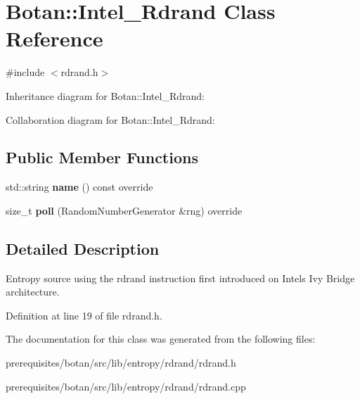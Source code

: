 \hypertarget{class_botan_1_1_intel___rdrand}{}\section{Botan\+:\+:Intel\+\_\+\+Rdrand Class Reference}
\label{class_botan_1_1_intel___rdrand}


{\ttfamily \#include $<$rdrand.\+h$>$}



Inheritance diagram for Botan\+:\+:Intel\+\_\+\+Rdrand\+:


Collaboration diagram for Botan\+:\+:Intel\+\_\+\+Rdrand\+:
\subsection*{Public Member Functions}
\begin{DoxyCompactItemize}
\item 
\mbox{\label{class_botan_1_1_intel___rdrand_a67af8b1f3aff351a36779805f226a911}} 
std\+::string {\bfseries name} () const override
\item 
\mbox{\label{class_botan_1_1_intel___rdrand_a9e319bd899b84572b1b89f7e29cc216a}} 
size\+\_\+t {\bfseries poll} (Random\+Number\+Generator \&rng) override
\end{DoxyCompactItemize}


\subsection{Detailed Description}
Entropy source using the rdrand instruction first introduced on Intel\textquotesingle{}s Ivy Bridge architecture. 

Definition at line 19 of file rdrand.\+h.



The documentation for this class was generated from the following files\+:\begin{DoxyCompactItemize}
\item 
prerequisites/botan/src/lib/entropy/rdrand/rdrand.\+h\item 
prerequisites/botan/src/lib/entropy/rdrand/rdrand.\+cpp\end{DoxyCompactItemize}
